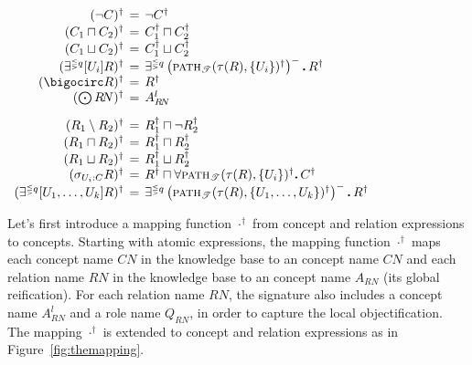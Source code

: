 \documentclass[envcountsame,draft]{llncs}
\newcommand{\greif}[1]{\ensuremath{\bigocirc#1}}
\newcommand{\lreif}[1]{\ensuremath{\bigodot#1}}
\newcommand{\per}{\mathpunct{\mbox{\bf .}}}
\newcommand{\pth}[2]{\ensuremath{\textsc{path}_{\mathscr{T}}(#1,#2)}\xspace}
\begin{document}
\begin{figure*}
	[t] 
	\begin{center}
		\renewcommand{\arraystretch}{1.2} $ 
		\begin{array}{r@{\hspace{1ex}}c@{\hspace{1ex}}l} 
			(\neg C)^\dag &=& \neg C^\dag \\
			(C_1 \sqcap C_2)^\dag & =& C_1^\dag \sqcap C_2^\dag \\
			(C_1 \sqcup C_2)^\dag & =& C_1^\dag \sqcup C_2^\dag \\
			(\EXISTR{q}{U_i} R)^\dag & =& \card{q}{\left(\pth{\tau(R)}{\{U_i\}}^\dag\right)^-}{R^\dag}\\
			(\greif{R})^\dag &=& R^\dag \\
			(\lreif{R\!N})^\dag &=& A^l_{R\!N}
			\vspace{2ex}\\
			(R_1\setminus R_2)^\dag &=& R_1^\dag\sqcap \neg R_2^\dag\\
			(R_1 \sqcap R_2)^\dag & =& R_1^\dag \sqcap R_2^\dag\\
			(R_1 \sqcup R_2)^\dag & =& R_1^\dag \sqcup R_2^\dag\\
			(\selects{U_i}{C}{R})^\dag & =& R^\dag \sqcap \forall \pth{\tau(R)}{\{U_i\}}^\dag \per C^\dag\\
			(\EXISTR{q}{U_1,\ldots,U_k} R)^\dag & =&
			\card{q}{\left(\pth{\tau(R)}{\{U_1,\ldots,U_k\}}^\dag\right)^-}{R^\dag} 
		\end{array}
		$ 
		\renewcommand{\arraystretch}{1} 
	\end{center}
	\caption{\label{fig:themapping} The mapping for concept and relation expressions.} 
\end{figure*}

Let's first introduce a mapping function $\cdot^\dag$ from \DLRpm
concept and relation expressions to \ALCQI concepts. Starting with
atomic expressions, the mapping function $\cdot^\dag$ maps each
concept name $C\!N$ in the \DLRpm knowledge base to an \ALCQI concept
name $C\!N$ and each relation name $R\!N$ in the \DLRpm knowledge base to
an \ALCQI concept name $A_{R\!N}$ (its global reification).
%
For each relation name $R\!N$, the \ALCQI signature also
includes a concept name $A_{R\!N}^{l}$ and a role name $Q_{R\!N}$, in
order to capture the local objectification. The mapping $\cdot^\dag$
is extended to concept and relation expressions as in
Figure~\ref{fig:themapping}.
\end{document}
